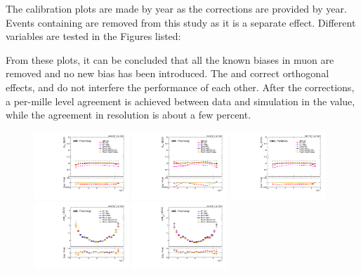 The calibration plots are made by year as the corrections are provided by year.
Events containing \FSR are removed from this study as it is a separate effect.
Different variables are tested in the Figures listed:

From these plots, it can be concluded that all the known biases in muon \pt are removed and no new bias has been introduced.
The \RochCorr and \GeoFit correct orthogonal effects, and do not interfere the performance of each other.
After the corrections, a per-mille level agreement is achieved between data and simulation in the \mmm value,
while the agreement in \mmm resolution is about a few percent. 

\begin{figure}[!htb]
      \centering
      \captionsetup{justification=justified}
      \includegraphics[width=0.32\textwidth]{pics/muon_corr/muon_cal/2016/muP_eta_summary_mean.pdf}
      \includegraphics[width=0.32\textwidth]{pics/muon_corr/muon_cal/2017/muP_eta_summary_mean.pdf}
      \includegraphics[width=0.32\textwidth]{pics/muon_corr/muon_cal/2018/muP_eta_summary_mean.pdf}
      \includegraphics[width=0.32\textwidth]{pics/muon_corr/muon_cal/2016/muP_eta_summary_reso.pdf}
      \includegraphics[width=0.32\textwidth]{pics/muon_corr/muon_cal/2017/muP_eta_summary_reso.pdf}

\end{figure}
